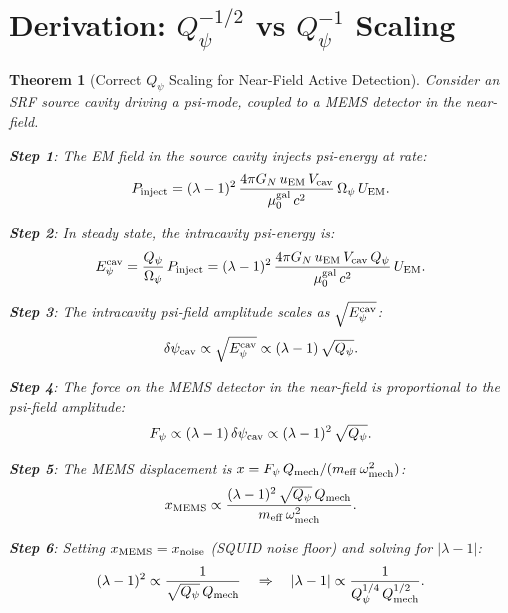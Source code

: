 \documentclass[11pt]{article}
\newcommand{\dpsi}{\delta\psi}
\newcommand{\lam}{\lambda}
\newcommand{\Opsi}{\Omega_\psi}
\newcommand{\Qpsi}{Q_\psi}
\newcommand{\Qmech}{Q_{\rm mech}}
\newcommand{\Vcav}{V_{\rm cav}}
\newcommand{\muG}{\mu_0^{\rm gal}}
\newcommand{\lbone}{|\lam - 1|}
\newcommand{\GN}{G_N}
\newtheorem{theorem}{Theorem}[section]
\theoremstyle{definition}
\theoremstyle{remark}
\begin{document}
\section{Derivation: $\Qpsi^{-1/2}$ vs $\Qpsi^{-1}$ Scaling}
\label{sec:scaling_derivation}

\begin{theorem}[Correct $\Qpsi$ Scaling for Near-Field Active Detection]
\label{thm:correct_scaling}
Consider an SRF source cavity driving a psi-mode, coupled to a MEMS
detector in the near-field.

\textbf{Step 1}: The EM field in the source cavity injects psi-energy at
rate:
\begin{equation}
P_{\rm inject} = (\lam-1)^2\,\frac{4\pi\GN\,u_{\rm EM}\,\Vcav}{\muG\,c^2}
\,\Opsi\,U_{\rm EM}.
\label{eq:P_inject}
\end{equation}

\textbf{Step 2}: In steady state, the intracavity psi-energy is:
\begin{equation}
E_\psi^{\rm cav} = \frac{\Qpsi}{\Opsi}\,P_{\rm inject}
= (\lam-1)^2\,\frac{4\pi\GN\,u_{\rm EM}\,\Vcav\,\Qpsi}{\muG\,c^2}
\,U_{\rm EM}.
\label{eq:E_psi_cav}
\end{equation}

\textbf{Step 3}: The intracavity psi-field amplitude scales as
$\sqrt{E_\psi^{\rm cav}}$:
\begin{equation}
\dpsi_{\rm cav} \propto \sqrt{E_\psi^{\rm cav}}
\propto (\lam-1)\,\sqrt{\Qpsi}.
\label{eq:dpsi_cav}
\end{equation}

\textbf{Step 4}: The force on the MEMS detector in the near-field is
proportional to the psi-field amplitude:
\begin{equation}
F_\psi \propto (\lam-1)\,\dpsi_{\rm cav}
\propto (\lam-1)^2\,\sqrt{\Qpsi}.
\label{eq:F_psi}
\end{equation}

\textbf{Step 5}: The MEMS displacement is $x = F_\psi\,\Qmech/(m_{\rm eff}\,\omega_{\rm mech}^2)$:
\begin{equation}
x_{\rm MEMS} \propto \frac{(\lam-1)^2\,\sqrt{\Qpsi}\,\Qmech}
{m_{\rm eff}\,\omega_{\rm mech}^2}.
\label{eq:x_MEMS}
\end{equation}

\textbf{Step 6}: Setting $x_{\rm MEMS} = x_{\rm noise}$ (SQUID noise
floor) and solving for $\lbone$:
\begin{equation}
(\lam-1)^2 \propto \frac{1}{\sqrt{\Qpsi}\,\Qmech}
\quad\Rightarrow\quad
\lbone \propto \frac{1}{\Qpsi^{1/4}\,\Qmech^{1/2}}.
\label{eq:scaling_from_force}
\end{equation}


\end{theorem}
\end{document}
